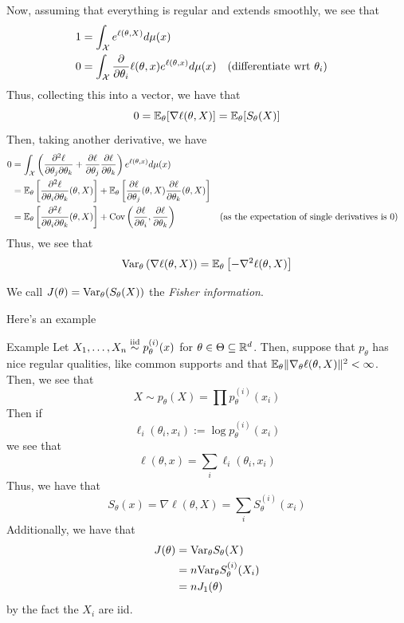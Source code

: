 Now, assuming that everything is regular and extends smoothly, we see that
\begin{align*}
    1 &= \int_{\mathcal{X}} e^{\ell(\theta, X)}d\mu(x)\\
    0 &= \int_{\mathcal{X}} \frac{\partial}{\partial \theta_i}\ell(\theta, x)e^{\ell(\theta, x)}d\mu(x) && (\text{differentiate wrt } \theta_i)\\
\end{align*}
Thus, collecting this into a vector, we have that
\[ 0 = \mathbb{E}_{\theta}[\nabla \ell(\theta, X)] = \mathbb{E}_{\theta}[S_{\theta}(X)] \]
Then, taking another derivative, we have
\begin{align*}
    0 &= \int_{\mathcal{X}}\left(\frac{\partial^2 \ell}{\partial \theta_j \partial \theta_k} + \frac{\partial \ell}{\partial \theta_j}\frac{\partial \ell}{\partial \theta_k}\right)e^{\ell(\theta, x)}d\mu(x)\\
    &= \mathbb{E}_{\theta}\left[\frac{\partial^2 \ell}{\partial \theta_i \partial \theta_k}(\theta, X)\right] + \mathbb{E}_{\theta}\left[\frac{\partial \ell}{\partial \theta_j}(\theta, X) \frac{\partial \ell}{\partial \theta_k}(\theta, X)\right]\\
    &= \mathbb{E}_{\theta}\left[\frac{\partial^2 \ell}{\partial \theta_i \partial \theta_k}(\theta, X)\right] + \text{Cov}\left(\frac{\partial \ell}{\partial \theta_i}, \frac{\partial \ell}{\partial \theta_k}\right) && (\text{as the expectation of single derivatives is 0})
\end{align*}
Thus, we see that
\[ \text{Var}_{\theta}\left(\nabla \ell(\theta, X)\right) = \mathbb{E}_{\theta}\left[-\nabla^2 \ell(\theta, X)\right] \]

\begin{definition}
    We call $J(\theta) = \text{Var}_{\theta}(S_{\theta}(X))$ the \emph{Fisher information}.
\end{definition}

Here's an example

\begin{example}{Example}
    Let $X_1, \ldots, X_n \overset{\text{iid}}{\sim} p_{\theta}^{(i)}(x)$ for $\theta \in \Theta \subseteq \mathbb{R}^d$. Then, suppose that $p_{\theta}$ has nice regular qualities, like common supports and that $\mathbb{E}_{\theta}\lVert {\nabla_{\theta} \ell(\theta, X)} \rVert^2 < \infty$. Then, we see that
    \[ X \sim p_{\theta}(X) = \prod p_{\theta}^{(i)}(x_i) \]
    Then if
    \[ \ell_i(\theta_i, x_i) := \log p_{\theta}^{(i)}(x_i) \]
    we see that
    \[ \ell(\theta, x) = \sum_{i} \ell_i(\theta_i, x_i) \]
    Thus, we have that
    \[ S_{\theta}(x) = \nabla \ell(\theta, X) = \sum_{i} S_{\theta}^{(i)}(x_i) \]
    Additionally, we have that
    \begin{align*}
        J(\theta) &= \text{Var}_{\theta} S_{\theta}(X)\\
        &= n\text{Var}_{\theta} S_{\theta}^{(i)}(X_i)\\
        &= nJ_{1}(\theta)
    \end{align*}
    by the fact the $X_i$ are iid. 
\end{example}

